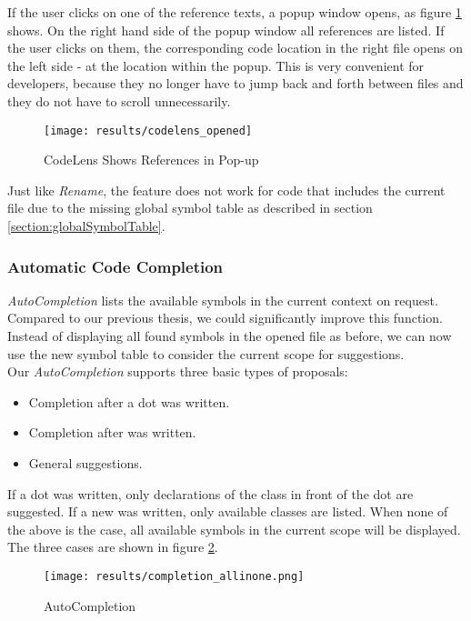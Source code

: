 If the user clicks on one of the reference texts, a popup window opens,
as figure \ref{fig:result_codelens_references_popup} shows.
On the right hand side of the popup window all references are listed.
If the user clicks on them, the corresponding code
location in the right file opens on the left side - at the location within the popup.
This is very convenient for developers,
because they no longer have to jump back and forth between files and they do not have to scroll unnecessarily.

\begin{figure}[H]
    \centering
    \texttt{[image: results/codelens\_opened]}
    \caption{CodeLens Shows References in Pop-up}
    \label{fig:result_codelens_references_popup}
\end{figure}

Just like \textit{Rename}, the feature does not work for code that includes the current file
due to the missing global symbol table as described in section \ref{section:globalSymbolTable}.

\subsubsection{Automatic Code Completion}
\textit{AutoCompletion} lists the available symbols in the current context on request.
Compared to our previous thesis, we could significantly improve this function.
Instead of displaying all found symbols in the opened file as before,
we can now use the new symbol table to consider the current scope for suggestions. \\

Our \textit{AutoCompletion} supports three basic types of proposals:
\begin{itemize}
    \item Completion after a dot was written.
    \item Completion after  was written.
    \item General suggestions.
\end{itemize}

If a dot was written, only declarations of the class in front of the dot are suggested.
If a new was written, only available classes are listed.
When none of the above is the case, all available symbols in the current scope will be displayed.
The three cases are shown in figure \ref{fig:result_completion}.

\begin{figure}[H]
    \centering
    \texttt{[image: results/completion\_allinone.png]}
    \caption{AutoCompletion}
    \label{fig:result_completion}
\end{figure}

